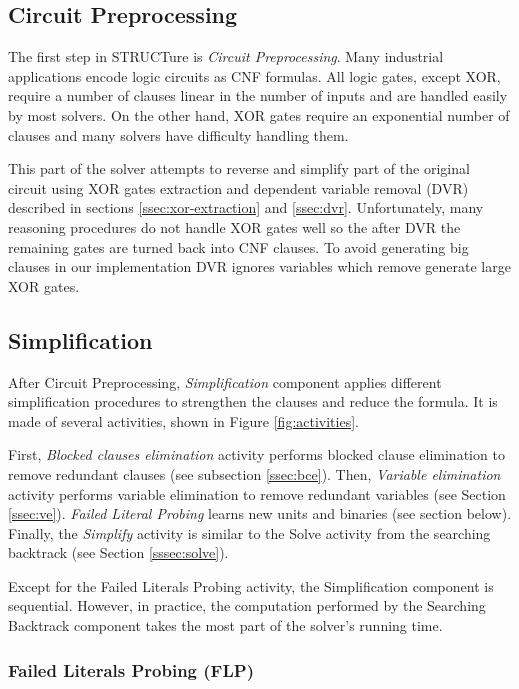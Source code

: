 \subsection{Circuit Preprocessing}

The first step in STRUCTure is \emph{Circuit Preprocessing}. Many
industrial applications encode logic circuits as CNF formulas.
All logic gates, except XOR, require a number of clauses linear in the number
of inputs and are handled easily by most solvers. On the other hand,
XOR gates require an exponential number of clauses and many solvers
have difficulty handling them.

This part of the solver attempts to reverse and simplify part of the
original circuit using XOR gates extraction and dependent variable
removal (DVR) described in sections \ref{ssec:xor-extraction}
and \ref{ssec:dvr}.  Unfortunately, many reasoning procedures do
not handle XOR gates well so the after DVR the remaining gates are
turned back into CNF clauses. To avoid generating big clauses in
our implementation DVR ignores variables which remove
generate large XOR gates.


\subsection{Simplification}

After Circuit Preprocessing, \emph{Simplification} component applies
different simplification procedures to strengthen the clauses and
reduce the formula. It is made of several activities, shown in
Figure \ref{fig:activities}.

First, \emph{Blocked clauses elimination} activity performs blocked
clause elimination to remove redundant clauses (see subsection
\ref{ssec:bce}). Then, \emph{Variable elimination} activity performs
variable elimination to remove redundant variables (see Section
\ref{ssec:ve}). \emph{Failed Literal Probing} learns new units
and binaries (see section below).  Finally, the \emph{Simplify}
activity is similar to the Solve activity from the searching
backtrack (see Section \ref{sssec:solve}).

Except for the Failed Literals Probing activity, the Simplification
component is sequential. However, in practice, the computation
performed by the Searching Backtrack component takes the most part
of the solver's running time.


\subsubsection{Failed Literals Probing (FLP)}
\label{sssec:flp}


